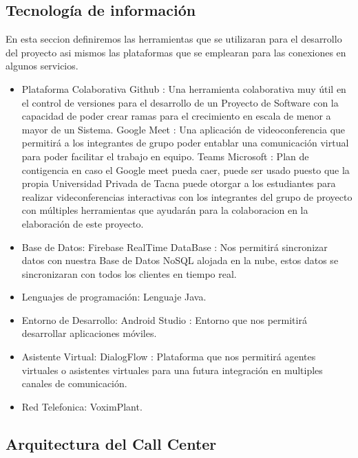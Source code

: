\documentclass[twoside,twocolumn]{article}
\begin{document}
\subsection{Tecnología de información}
En esta seccion definiremos las herramientas que se utilizaran para el desarrollo del proyecto asi mismos las plataformas que se emplearan para las conexiones en algunos servicios.
\begin{itemize}
\item Plataforma Colaborativa
\subitem Github : Una herramienta colaborativa muy útil en el control de versiones para el desarrollo de un Proyecto de Software con la capacidad de poder crear ramas para el crecimiento en escala de menor a mayor de un Sistema.
\subitem Google Meet : Una aplicación de videoconferencia que permitirá a los integrantes de grupo poder entablar una comunicación virtual para poder facilitar el trabajo en equipo.
\subitem Teams Microsoft : Plan de contigencia en caso el Google meet pueda caer, puede ser usado puesto que la propia Universidad Privada de Tacna puede otorgar a los estudiantes para realizar videconferencias interactivas con los integrantes del grupo de proyecto con múltiples herramientas que ayudarán para la colaboracion en la elaboración de este proyecto.
\item Base de Datos:
\subitem Firebase RealTime DataBase : Nos permitirá sincronizar datos con nuestra Base de Datos NoSQL alojada en la nube, estos datos se sincronizaran con todos los clientes en tiempo real.
\item Lenguajes de programación:
\subitem Lenguaje Java.
\item Entorno de Desarrollo:
\subitem Android Studio : Entorno que nos permitirá desarrollar aplicaciones móviles.
\item Asistente Virtual:
\subitem DialogFlow : Plataforma que nos permitirá agentes virtuales o asistentes virtuales para una futura integración en multiples canales de comunicación.
\item Red Telefonica:
\subitem VoximPlant.
\end{itemize}

\subsection{Arquitectura del Call Center}
\end{document}

